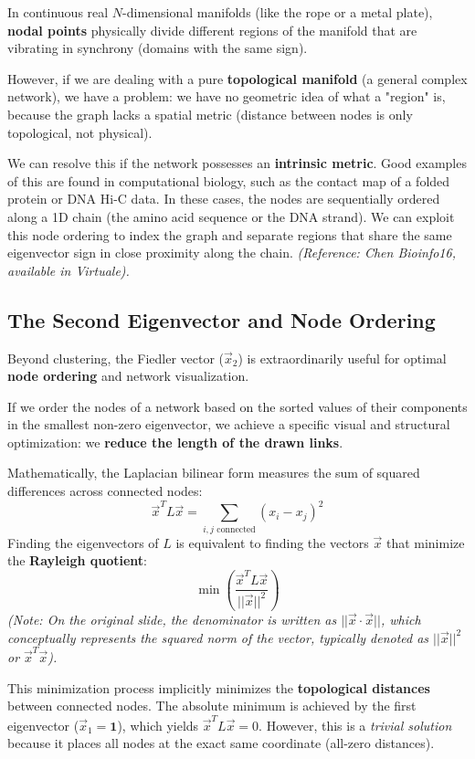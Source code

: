 In continuous real \( N \)-dimensional manifolds (like the rope or a metal plate), \textbf{nodal points} physically divide different regions of the manifold that are vibrating in synchrony (domains with the same sign).

However, if we are dealing with a pure \textbf{topological manifold} (a general complex network), we have a problem: we have no geometric idea of what a "region" is, because the graph lacks a spatial metric (distance between nodes is only topological, not physical).

We can resolve this if the network possesses an \textbf{intrinsic metric}. Good examples of this are found in computational biology, such as the contact map of a folded protein or DNA Hi-C data. In these cases, the nodes are sequentially ordered along a 1D chain (the amino acid sequence or the DNA strand). We can exploit this node ordering to index the graph and separate regions that share the same eigenvector sign in close proximity along the chain.
\textit{(Reference: Chen Bioinfo16, available in Virtuale).}

\subsection{The Second Eigenvector and Node Ordering}
Beyond clustering, the Fiedler vector (\( \vec{x}_2 \)) is extraordinarily useful for optimal \textbf{node ordering} and network visualization.

If we order the nodes of a network based on the sorted values of their components in the smallest non-zero eigenvector, we achieve a specific visual and structural optimization: we \textbf{reduce the length of the drawn links}.

Mathematically, the Laplacian bilinear form measures the sum of squared differences across connected nodes:
\[
    \vec{x}^T L \vec{x} = \sum_{i,j \text{ connected}} (x_i - x_j)^2
\]
Finding the eigenvectors of \( L \) is equivalent to finding the vectors \( \vec{x} \) that minimize the \textbf{Rayleigh quotient}:
\[
    \min \left( \frac{\vec{x}^T L \vec{x}}{||\vec{x}||^2} \right)
\]
\textit{(Note: On the original slide, the denominator is written as \( ||\vec{x} \cdot \vec{x}|| \), which conceptually represents the squared norm of the vector, typically denoted as \( ||\vec{x}||^2 \) or \( \vec{x}^T \vec{x} \)).}

This minimization process implicitly minimizes the \textbf{topological distances} between connected nodes.
The absolute minimum is achieved by the first eigenvector (\( \vec{x}_1 = \mathbf{1} \)), which yields \( \vec{x}^T L \vec{x} = 0 \). However, this is a \textit{trivial solution} because it places all nodes at the exact same coordinate (all-zero distances).

